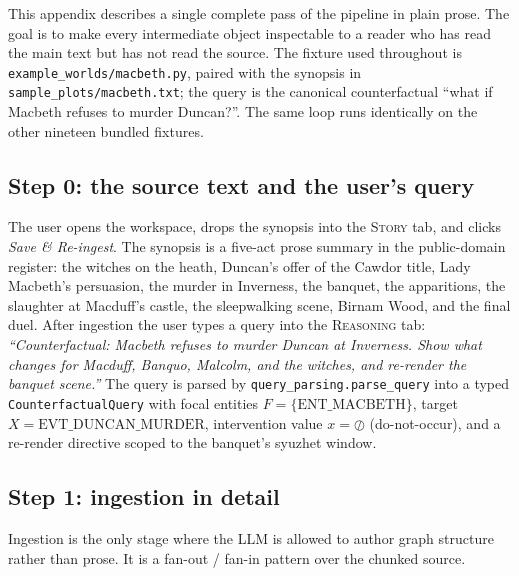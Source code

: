 \documentclass[11pt]{article}
\begin{document}
This appendix describes a single complete pass of the pipeline in
plain prose. The goal is to make every intermediate object
inspectable to a reader who has read the main text but has not
read the source. The fixture used throughout is
\texttt{example\_worlds/macbeth.py}, paired with the synopsis in
\texttt{sample\_plots/macbeth.txt}; the query is the canonical
counterfactual ``what if Macbeth refuses to murder Duncan?''.
The same loop runs identically on the other nineteen bundled
fixtures.

\subsection{Step 0: the source text and the user's query}
\label{app:wk-source}

The user opens the workspace, drops the synopsis into the
\textsc{Story} tab, and clicks \emph{Save \& Re-ingest}. The
synopsis is a five-act prose summary in the public-domain
register: the witches on the heath, Duncan's offer of the
Cawdor title, Lady Macbeth's persuasion, the murder in
Inverness, the banquet, the apparitions, the slaughter at
Macduff's castle, the sleepwalking scene, Birnam Wood, and the
final duel. After ingestion the user types a query into the
\textsc{Reasoning} tab: \emph{``Counterfactual: Macbeth refuses
to murder Duncan at Inverness. Show what changes for Macduff,
Banquo, Malcolm, and the witches, and re-render the banquet
scene.''} The query is parsed by
\texttt{query\_parsing.parse\_query} into a typed
\texttt{CounterfactualQuery} with focal entities
$F = \{\text{ENT\_MACBETH}\}$, target
$X = \text{EVT\_DUNCAN\_MURDER}$, intervention value
$x = \oslash$ (do-not-occur), and a re-render directive scoped
to the banquet's syuzhet window.

\subsection{Step 1: ingestion in detail}
\label{app:wk-ingest}

Ingestion is the only stage where the LLM is allowed to author
graph structure rather than prose. It is a fan-out / fan-in
pattern over the chunked source.
\end{document}
